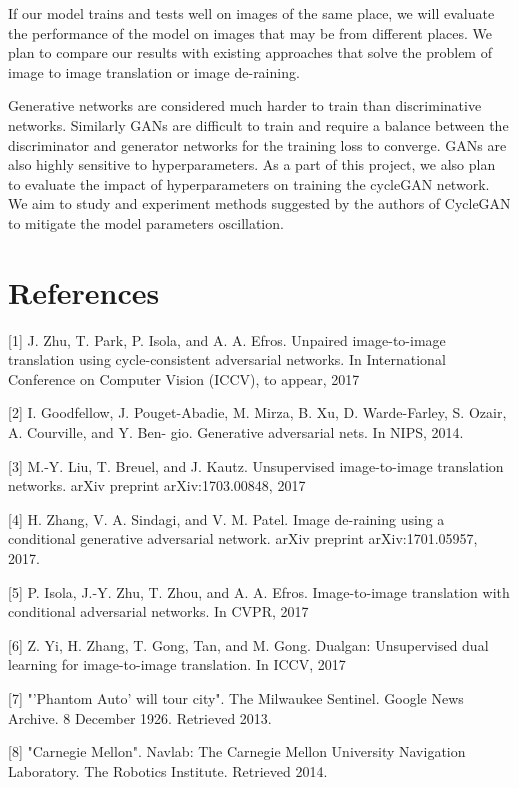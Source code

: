 \documentclass{article}
\begin{document}
If our model trains and tests well on images of the same place, we will 
evaluate the performance of the model on images that may be from different 
places. We plan to compare our results with existing approaches that solve 
the problem of image to image translation or image de-raining.

Generative networks are considered much harder to train than discriminative 
networks. Similarly GANs are difficult to train and require a balance 
between the discriminator and generator networks for the training loss 
to converge. GANs are also highly sensitive to hyperparameters. 
As a part of this project, we also plan to evaluate the impact of 
hyperparameters on training the cycleGAN network. We aim to study and 
experiment methods suggested by the authors of CycleGAN to mitigate the 
model parameters oscillation.

\section*{References}

\small
\label{[1]}[1] J. Zhu, T. Park, P. Isola, and A. A. Efros. Unpaired image-to-image 
translation using cycle-consistent adversarial networks. 
In International Conference on Computer Vision (ICCV), to appear, 2017

\label{[2]}[2] I. Goodfellow, J. Pouget-Abadie, M. Mirza, B. Xu, D. Warde-Farley, 
S. Ozair, A. Courville, and Y. Ben- gio. Generative adversarial nets. 
In NIPS, 2014.

\label{[3]}[3] M.-Y. Liu, T. Breuel, and J. Kautz. Unsupervised 
image-to-image translation networks. arXiv preprint arXiv:1703.00848, 2017

\label{[4]}[4] H. Zhang, V. A. Sindagi, and V. M. Patel. Image de-raining using a conditional generative 
adversarial network. arXiv preprint arXiv:1701.05957, 2017.

\label{[5]}[5] P. Isola, J.-Y. Zhu, T. Zhou, and A. A. Efros. 
Image-to-image translation with conditional adversarial networks. 
In CVPR, 2017

\label{[6]}[6] Z. Yi, H. Zhang, T. Gong, Tan, and M. Gong. Dualgan: 
Unsupervised dual learning for image-to-image translation. 
In ICCV, 2017

\label{[7]}[7] "'Phantom Auto' will tour city". The Milwaukee Sentinel. 
Google News Archive. 8 December 1926. Retrieved 2013.

\label{[8]}[8] "Carnegie Mellon". Navlab: The Carnegie Mellon University Navigation Laboratory. 
The Robotics Institute. Retrieved 2014.
\end{document}
